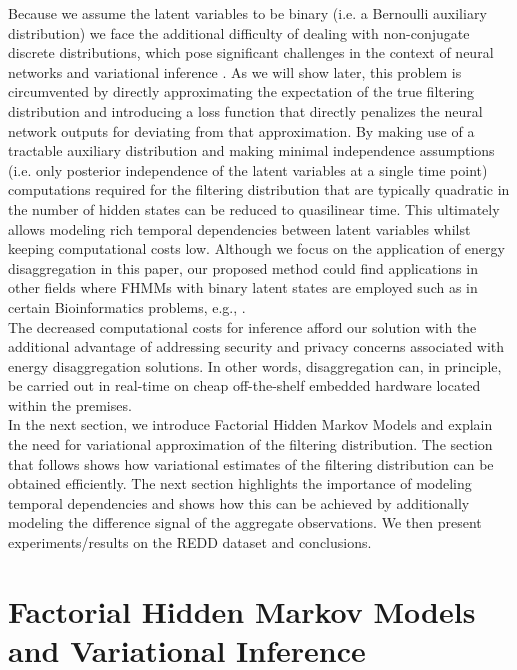 Because we assume the latent variables to be binary (i.e. a Bernoulli auxiliary distribution) we face the additional difficulty of dealing with non-conjugate discrete distributions, which pose significant challenges in the context of neural networks and variational inference \cite{kingma2013auto}. As we will show later, this problem is circumvented by directly approximating the expectation of the true filtering distribution and introducing a loss function that directly penalizes the neural network outputs for deviating from that approximation. By making use of a tractable auxiliary distribution and making minimal independence assumptions (i.e. only posterior independence of the latent variables at a single time point) computations required for the filtering distribution that are typically quadratic in the number of hidden states can be reduced to quasilinear time. This ultimately allows modeling rich temporal dependencies between latent variables whilst keeping computational costs low. Although we focus on the application of energy disaggregation in this paper, our proposed method could find applications in other fields where FHMMs with binary latent states are employed such as in certain Bioinformatics problems, e.g., \cite{stanculescu2014hierarchical,asif2011large}.\\
The decreased computational costs for inference afford our solution with the additional advantage of addressing security and privacy concerns associated with energy disaggregation solutions. In other words, disaggregation can, in principle, be carried out in real-time on cheap off-the-shelf embedded hardware located within the premises.\\
In the next section, we introduce Factorial Hidden Markov Models and explain the need for variational approximation of the filtering distribution. The section that follows shows how variational estimates of the filtering distribution can be obtained efficiently. The next section highlights the importance of modeling temporal dependencies and shows how this can be achieved by additionally modeling the difference signal of the aggregate observations. We then present experiments/results on the REDD dataset and conclusions.

\section{Factorial Hidden Markov Models and Variational Inference}

